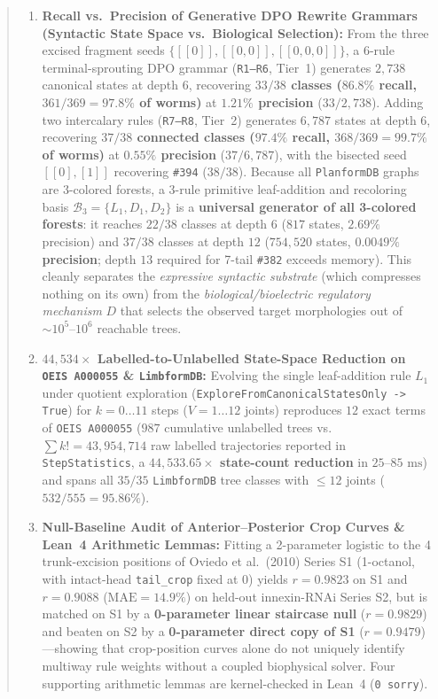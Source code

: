 \documentclass[11pt,a4paper]{article}
\theoremstyle{definition}
\theoremstyle{remark}
\begin{document}
\begin{abstract}
\begin{enumerate}
  \item \textbf{Recall vs.\ Precision of Generative DPO Rewrite Grammars (Syntactic State Space vs.\ Biological Selection):} From the three excised fragment seeds $\{[[0]], [[0,0]], [[0,0,0]]\}$, a 6-rule terminal-sprouting DPO grammar (\texttt{R1--R6}, Tier~1) generates $2{,}738$ canonical states at depth $6$, recovering \textbf{$33/38$ classes ($86.8\%$ recall, $361/369 = 97.8\%$ of worms)} at \textbf{$1.21\%$ precision} ($33/2{,}738$). Adding two intercalary rules (\texttt{R7--R8}, Tier~2) generates $6{,}787$ states at depth $6$, recovering \textbf{$37/38$ connected classes ($97.4\%$ recall, $368/369 = 99.7\%$ of worms)} at \textbf{$0.55\%$ precision} ($37/6{,}787$), with the bisected seed $[[0],[1]]$ recovering \texttt{\#394} ($38/38$). Because all \texttt{PlanformDB} graphs are 3-colored forests, a 3-rule primitive leaf-addition and recoloring basis $\mathcal{B}_3 = \{L_1, D_1, D_2\}$ is a \textbf{universal generator of all 3-colored forests}: it reaches $22/38$ classes at depth $6$ ($817$ states, $2.69\%$ precision) and $37/38$ classes at depth $12$ ($754{,}520$ states, \textbf{$0.0049\%$ precision}; depth $13$ required for 7-tail \texttt{\#382} exceeds memory). This cleanly separates the \emph{expressive syntactic substrate} (which compresses nothing on its own) from the \emph{biological/bioelectric regulatory mechanism} $D$ that selects the observed target morphologies out of $\sim 10^5\text{--}10^6$ reachable trees.
  \item \textbf{$44{,}534\times$ Labelled-to-Unlabelled State-Space Reduction on \texttt{OEIS A000055} \& \texttt{LimbformDB}:} Evolving the single leaf-addition rule $L_1$ under quotient exploration (\texttt{ExploreFromCanonicalStatesOnly -> True}) for $k = 0 \dots 11$ steps ($V = 1 \dots 12$ joints) reproduces $12$ exact terms of \texttt{OEIS A000055} ($987$ cumulative unlabelled trees vs.\ $\sum k! = 43{,}954{,}714$ raw labelled trajectories reported in \texttt{StepStatistics}, a \textbf{$44{,}533.65\times$ state-count reduction} in $25\text{--}85\text{ ms}$) and spans all $35/35$ \texttt{LimbformDB} tree classes with $\le 12$ joints ($532/555 = 95.86\%$).
  \item \textbf{Null-Baseline Audit of Anterior--Posterior Crop Curves \& Lean~4 Arithmetic Lemmas:} Fitting a 2-parameter logistic to the 4 trunk-excision positions of Oviedo et al.\ (2010) Series S1 (1-octanol, with intact-head \texttt{tail\_crop} fixed at $0$) yields $r = 0.9823$ on S1 and $r = 0.9088$ ($\text{MAE} = 14.9\%$) on held-out innexin-RNAi Series S2, but is matched on S1 by a \textbf{0-parameter linear staircase null} ($r = 0.9829$) and beaten on S2 by a \textbf{0-parameter direct copy of S1} ($r = 0.9479$)---showing that crop-position curves alone do not uniquely identify multiway rule weights without a coupled biophysical solver. Four supporting arithmetic lemmas are kernel-checked in Lean~4 (\texttt{0 sorry}).
\end{enumerate}
\end{abstract}
\end{document}
